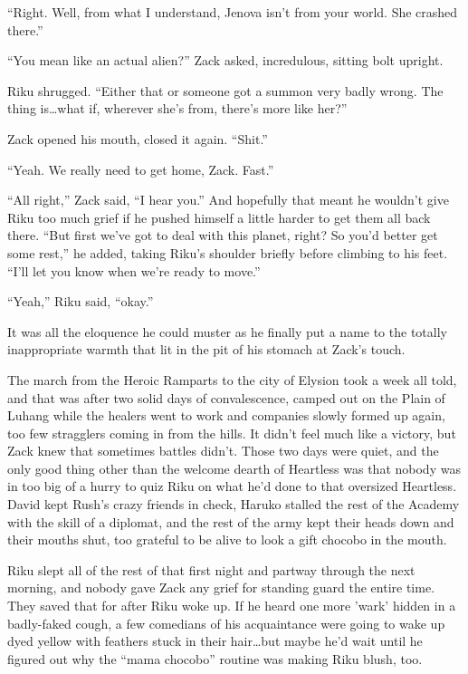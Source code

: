 ``Right. Well, from what I understand, Jenova isn't from your world. She crashed there.''

``You mean like an actual alien?'' Zack asked, incredulous, sitting bolt upright.

Riku shrugged. ``Either that or someone got a summon very badly wrong. The thing is\ldots what if, wherever she's from, there's more like her?''

Zack opened his mouth, closed it again. ``Shit.''

``Yeah. We really need to get home, Zack. Fast.''

``All right,'' Zack said, ``I hear you.'' And hopefully that meant he wouldn't give Riku too much grief if he pushed himself a little harder to get them all back there. ``But first we've got to deal with this planet, right? So you'd better get some rest,'' he added, taking Riku's shoulder briefly before climbing to his feet. ``I'll let you know when we're ready to move.''

``Yeah,'' Riku said, ``okay.''

It was all the eloquence he could muster as he finally put a name to the totally inappropriate warmth that lit in the pit of his stomach at Zack's touch.


\scenechange


The march from the Heroic Ramparts to the city of Elysion took a week all told, and that was after two solid days of convalescence, camped out on the Plain of Luhang while the healers went to work and companies slowly formed up again, too few stragglers coming in from the hills. It didn't feel much like a victory, but Zack knew that sometimes battles didn't. Those two days were quiet, and the only good thing other than the welcome dearth of Heartless was that nobody was in too big of a hurry to quiz Riku on what he'd done to that oversized Heartless. David kept Rush's crazy friends in check, Haruko stalled the rest of the Academy with the skill of a diplomat, and the rest of the army kept their heads down and their mouths shut, too grateful to be alive to look a gift chocobo in the mouth.

Riku slept all of the rest of that first night and partway through the next morning, and nobody gave Zack any grief for standing guard the entire time. They saved that for after Riku woke up. If he heard one more 'wark' hidden in a badly-faked cough, a few comedians of his acquaintance were going to wake up dyed yellow with feathers stuck in their hair\ldots but maybe he'd wait until he figured out why the ``mama chocobo'' routine was making Riku blush, too.

